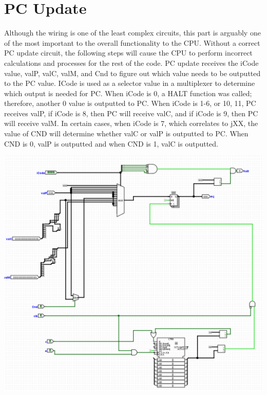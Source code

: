 \documentclass{article}
\begin{document}
\section{PC Update}
Although the wiring is one of the least complex circuits, this part is arguably one of the most important to the overall functionality to the CPU. Without a correct PC update circuit, the following steps will cause the CPU to perform incorrect calculations and processes for the rest of the code. PC update receives the iCode value, valP, valC, valM, and Cnd to figure out which value needs to be outputted to the PC value. ICode is used as a selector value in a multiplexer to determine which output is needed for PC. When iCode is 0, a HALT function was called; therefore, another 0 value is outputted to PC. When iCode is 1-6, or 10, 11, PC receives valP, if iCode is 8, then PC will receive valC, and if iCode is 9, then PC will receive valM. In certain cases, when iCode is 7, which correlates to jXX, the value of CND will determine whether valC or valP is outputted to PC. When CND is 0, valP is outputted and when CND is 1, valC is outputted. 
\begin{center}
    \includegraphics[scale=.5]{pcupdate.png} \\
\end{center}
\end{document}
